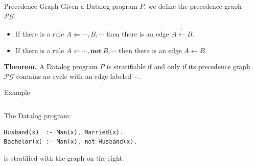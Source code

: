 \begin{frame}{Precedence Graph}
Given a Datalog program $P$, we define the precedence graph $\mathcal{PG}$:

\begin{itemize}
    \item If there is a rule $A \Leftarrow \cdots, B, \cdots$ then there is an
    edge $A \stackrel{+}\leftarrow B$.
    \item If there is a rule $A \Leftarrow \cdots, \textbf{not} \, B, \cdots$
    then there is an edge $A \stackrel{-}\leftarrow B$.
\end{itemize}

\pause

\textbf{Theorem.} A Datalog program $P$ is stratifiable if and only if its
precedence graph $\mathcal{PG}$ contains no cycle with an edge labeled $-$.
\end{frame}

\begin{frame}[fragile]{Example}
\begin{columns}
\begin{column}{.55\textwidth}
The Datalog program:
\begin{lstlisting}[language=flix]
Husband(x)  :- Man(x), Married(x).
Bachelor(x) :- Man(x), not Husband(x).
\end{lstlisting}

is stratified with the graph on the right.
\end{column}  
\begin{column}{.45\textwidth}
\end{column}%
\end{columns}
\end{frame}
    
